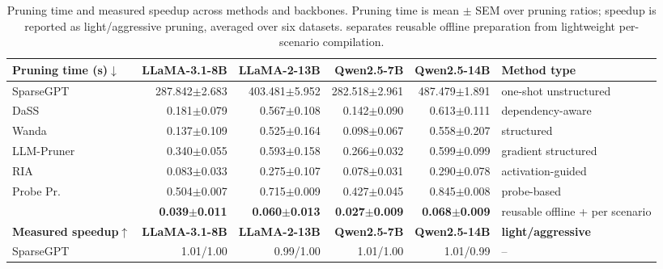 \begin{table}[tbp]
\centering\singlespacing\scriptsize
\caption{Pruning time and measured speedup across methods and backbones. Pruning time is mean $\pm$ SEM over pruning ratios; speedup is reported as light/aggressive pruning, averaged over six datasets. \SubspacePath{} separates reusable offline preparation from lightweight per-scenario compilation.}
\label{tab:sp-runtime}
\setlength{\tabcolsep}{2.4pt}\renewcommand{\arraystretch}{1.04}
\begin{adjustbox}{max width=\textwidth}
\begin{tabular}{lrrrrl}
\toprule
\textbf{Pruning time (s)$\downarrow$} & \textbf{LLaMA-3.1-8B} & \textbf{LLaMA-2-13B} & \textbf{Qwen2.5-7B} & \textbf{Qwen2.5-14B} & \textbf{Method type}\\
\midrule
SparseGPT & 287.842{\scriptsize$\pm$2.683} & 403.481{\scriptsize$\pm$5.952} & 282.518{\scriptsize$\pm$2.961} & 487.479{\scriptsize$\pm$1.891} & one-shot unstructured\\
DaSS & 0.181{\scriptsize$\pm$0.079} & 0.567{\scriptsize$\pm$0.108} & 0.142{\scriptsize$\pm$0.090} & 0.613{\scriptsize$\pm$0.111} & dependency-aware\\
Wanda & 0.137{\scriptsize$\pm$0.109} & 0.525{\scriptsize$\pm$0.164} & 0.098{\scriptsize$\pm$0.067} & 0.558{\scriptsize$\pm$0.207} & structured\\
LLM-Pruner & 0.340{\scriptsize$\pm$0.055} & 0.593{\scriptsize$\pm$0.158} & 0.266{\scriptsize$\pm$0.032} & 0.599{\scriptsize$\pm$0.099} & gradient structured\\
RIA & 0.083{\scriptsize$\pm$0.033} & 0.275{\scriptsize$\pm$0.107} & 0.078{\scriptsize$\pm$0.031} & 0.290{\scriptsize$\pm$0.078} & activation-guided\\
Probe Pr. & 0.504{\scriptsize$\pm$0.007} & 0.715{\scriptsize$\pm$0.009} & 0.427{\scriptsize$\pm$0.045} & 0.845{\scriptsize$\pm$0.008} & probe-based\\
\rowcolor{SoftBlue}\textbf{\SubspacePath{}} & \textbf{0.039{\scriptsize$\pm$0.011}} & \textbf{0.060{\scriptsize$\pm$0.013}} & \textbf{0.027{\scriptsize$\pm$0.009}} & \textbf{0.068{\scriptsize$\pm$0.009}} & reusable offline + per scenario\\
\midrule
\textbf{Measured speedup$\uparrow$} & \textbf{LLaMA-3.1-8B} & \textbf{LLaMA-2-13B} & \textbf{Qwen2.5-7B} & \textbf{Qwen2.5-14B} & \textbf{light/aggressive}\\
\midrule
SparseGPT & 1.01/1.00 & 0.99/1.00 & 1.01/1.00 & 1.01/0.99 & --\\

\end{tabular}
\end{adjustbox}
\end{table}
